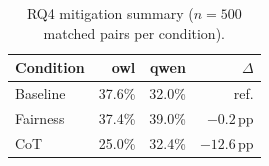 
\begin{table}[h]
\centering
\caption{RQ4 mitigation summary ($n=500$ matched pairs per condition).}
\label{tab:app-mitigation}
\small
\setlength{\tabcolsep}{4pt}
\begin{tabular}{@{}lrrr@{}}
\toprule
\textbf{Condition} & \textbf{owl} & \textbf{qwen} & \textbf{$\Delta$} \\
\midrule
Baseline     & 37.6\% & 32.0\% & ref. \\
Fairness     & 37.4\% & 39.0\% & $-0.2$\,pp \\
CoT          & 25.0\% & 32.4\% & $-12.6$\,pp \\
\bottomrule
\end{tabular}
\end{table}
